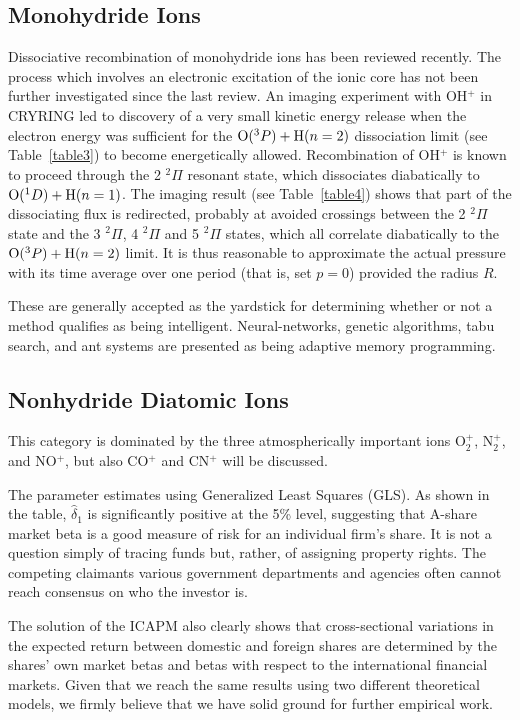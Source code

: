 \documentclass{ws-rv9x6}
\begin{document}
\subsection{Monohydride Ions}

Dissociative recombination of monohydride ions has been reviewed\break
recently.\cite{2,32} The process which involves an electronic
excitation of the ionic core has not been further investigated since
the last review.\cite{32} An imaging experiment with OH$^+$ in CRYRING
led to discovery of a very small kinetic energy release when the
electron energy was sufficient for the ${\rm O}(^3P) + {\rm H}(n=2)$
dissociation limit (see Table~\ref{table3}) to become energetically
allowed.\cite{84} Recombination of OH$^+$ is known to proceed through
the 2 $^2\Pi$ resonant state,\cite{85} which dissociates diabatically
to ${\rm O}(^1D) + {\rm H}(n=1)$. The imaging result (see
Table~\ref{table4}) shows that part of the dissociating flux is
redirected, probably at avoided crossings between the 2 $^2\Pi$ state
and the 3 $^2\Pi$, 4 $^2\Pi$ and 5 $^2\Pi$ states, which all correlate
diabatically to the ${\rm O}(^3P) + {\rm H}(n=2)$ limit. It is thus
reasonable to approximate the actual pressure with its time average
over one period (that is, set $p=0$) provided the radius $R$.

These are generally accepted as the yardstick for determining whether
or not a method qualifies as being intelligent. Neural-networks,
genetic algorithms, tabu search, and ant systems are presented as
being adaptive memory programming.

\subsection{Nonhydride Diatomic Ions}

This category is dominated by the three atmospherically important ions
O$_2^+$, N$_2^+$, and NO$^+$, but also CO$^+$ and CN$^+$ will be
discussed.

The parameter estimates using Generalized Least Squares (GLS). As
shown in the table, $\hat{\delta}_1$ is significantly positive at the
5\% level, suggesting that A-share market beta is a good measure of
risk for an individual firm's share. It is not a question simply of
tracing funds but, rather, of assigning property rights. The competing
claimants various government departments and agencies often cannot
reach consensus on who the investor is.

The solution of the ICAPM also clearly shows that cross-sectional
variations in the expected return between domestic and foreign shares
are determined by the shares' own market betas and betas with respect
to the international financial markets.  Given that we reach the same
results using two different theoretical models, we firmly believe that
we have solid ground for further empirical work. 
\end{document}
